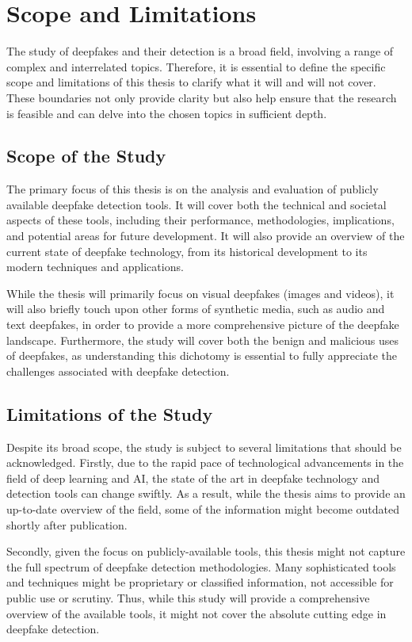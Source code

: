 \section{Scope and Limitations}\label{chapter:scope}
The study of deepfakes and their detection is a broad field, involving a range of complex and 
interrelated topics. Therefore, it is essential to define the specific scope and 
limitations of this thesis to clarify what it will and will not cover. These boundaries 
not only provide clarity but also help ensure that the research is feasible and can delve 
into the chosen topics in sufficient depth.

\subsection{Scope of the Study}
The primary focus of this thesis is on the analysis and evaluation of publicly available 
deepfake detection tools. It will cover both the technical and societal aspects of these 
tools, including their performance, methodologies, implications, and potential areas for 
future development. It will also provide an overview of the current state of deepfake 
technology, from its historical development to its modern techniques and applications.

While the thesis will primarily focus on visual deepfakes (images and videos), it will 
also briefly touch upon other forms of synthetic media, such as audio and text deepfakes, 
in order to provide a more comprehensive picture of the deepfake landscape. Furthermore, 
the study will cover both the benign and malicious uses of deepfakes, as understanding 
this dichotomy is essential to fully appreciate the challenges associated with deepfake 
detection.

\subsection{Limitations of the Study}
Despite its broad scope, the study is subject to several limitations that should be 
acknowledged. Firstly, due to the rapid pace of technological advancements in the field 
of deep learning and \ac{AI}, the state of the art in deepfake technology and detection tools 
can change swiftly. As a result, while the thesis aims to provide an up-to-date overview 
of the field, some of the information might become outdated shortly after publication.

Secondly, given the focus on publicly-available tools, this thesis might not capture 
the full spectrum of deepfake detection methodologies. Many sophisticated tools and 
techniques might be proprietary or classified information, not accessible for public 
use or scrutiny. Thus, while this study will provide a comprehensive overview of the 
available tools, it might not cover the absolute cutting edge in deepfake detection.


